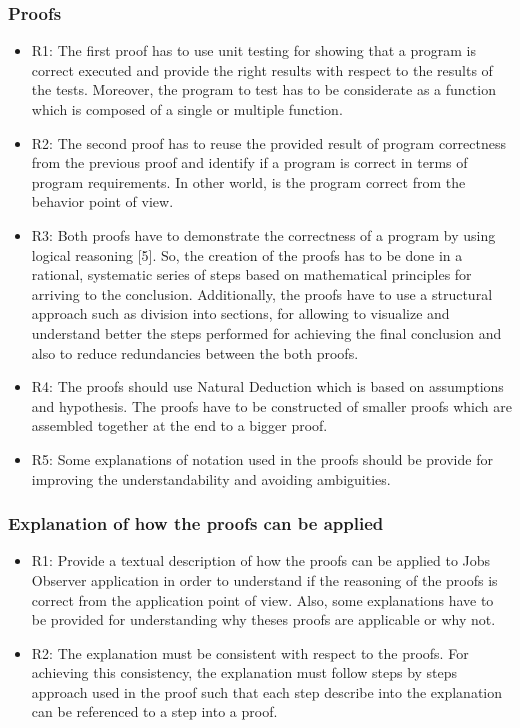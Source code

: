 \documentclass[conference,compsoc]{IEEEtran}
\begin{document}
\subsubsection{Proofs}
\begin{itemize}
	\item R1: The first proof has to use unit testing for showing that a program is correct executed and provide the right results with respect to the results of the tests. Moreover, the program to test has to be considerate as a function which is composed of a single or multiple function.
	\newline
	
	\item R2: The second proof has to reuse the provided result of program correctness from the previous proof and identify if a program is correct in terms of program requirements. In other world, is the program correct from the behavior point of view. 
	\newline
	
	\item R3: Both proofs have to demonstrate the correctness of a program by using logical reasoning [5]. So, the creation of the proofs has to be done in a rational, systematic series of steps based on mathematical principles for arriving to the conclusion. Additionally, the proofs have to use a structural approach such as division into sections, for allowing to visualize and understand better the steps performed for achieving the final conclusion and also to reduce redundancies between the both proofs. 
	\newline
	
	\item R4: The proofs should use Natural Deduction which is based on assumptions and hypothesis. The proofs have to be constructed of smaller proofs which are assembled together at the end to a bigger proof. 
	\newline
	
	\item R5: Some explanations of notation used in the proofs should be provide for improving the understandability and avoiding ambiguities. 
\end{itemize}
 
\subsubsection{Explanation of how the proofs can be applied}
\begin{itemize}
	\item R1:  Provide a textual description of how the proofs can be applied to Jobs Observer application in order to understand if the reasoning of the proofs is correct from the application point of view. Also, some explanations have to be provided for understanding why theses proofs are applicable or why not. 
	\newline
	\item R2:  The explanation must be consistent with respect to the proofs. For achieving this consistency, the explanation must follow steps by steps approach used in the proof such that each step describe into the explanation can be referenced to a step into a proof. 
	
\end{itemize}
\end{document}
